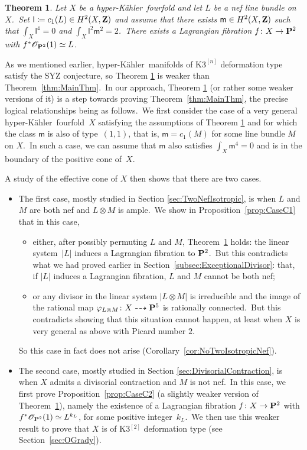 \documentclass[12pt]{amsart}
\def\cO{\mathscr{O}}
\def\Z{{\bf Z}}
\def\P{{\bf P}}
\def\phi{\varphi}
\def\ot{\otimes}
\def\isom{\simeq}
\def\dra{\dashrightarrow}
\def\hk{hyper-K\"ahler}
\newtheorem{theo}[lemm]{Theorem}
\theoremstyle{remark}
\def\lll{\ensuremath{\mathsf l}}
\def\mm{\ensuremath{\mathsf m}}
\begin{document}
\begin{theo}\label{thm:SYZ}
Let $X$ be a \hk\ fourfold and let $L$ be  a nef line bundle on $X$.\ Set
$\lll\coloneqq c_1(L) \in H^2(X,\Z)$ and assume that there exists $\mm\in H^2(X,\Z)$ such that     $\int_X \lll^4=0$ and $\int_X\lll^2\mm^2=2$.\
There exists a Lagrangian fibration $f\colon X\to\P^2$ with $f^*{\cO_{\P^2}}(1)\isom L$.
\end{theo}
As we mentioned earlier, \hk\ manifolds  of $\mathrm{K3}^{[n]}$ deformation type satisfy the SYZ conjecture, so Theorem \ref{thm:SYZ} is weaker than Theorem~\ref{thm:MainThm}.\  In our approach, Theorem \ref{thm:SYZ} (or rather  some weaker versions of it) is a step towards
proving   Theorem~\ref{thm:MainThm}, the precise logical relationships being   as follows.\
We first consider the case  of a very general \hk\ fourfold~$X$   satisfying the   assumptions  of Theorem \ref{thm:SYZ} and for which the class $\mm$ is also of type~$(1,1)$, that is, $\mm=c_1(M)$ for some line bundle $M$ on $X$.\
In such a case, we can assume that $\mm$ also satisfies $\int_X \mm^4=0$ and is in the boundary of the positive cone of~$X$.

A study of the effective cone of $X$ then shows that there are two cases.
\begin{itemize}
    \item The first case, mostly studied in Section \ref{sec:TwoNefIsotropic}, is when $L$ and $M$ are both nef and $L\ot M$ is ample.\
We show in  Proposition~\ref{prop:CaseC1} that in this case,
\begin{itemize}
    \item[$\circ$] either, after possibly permuting $L$ and $M$, Theorem~\ref{thm:SYZ} holds:   the linear system~$|L|$ induces a Lagrangian fibration to $\P^2$.\ But this contradicts what we had proved earlier in Section~\ref{subsec:ExceptionalDivisor}: that, if $|L|$ induces a Lagrangian fibration, $L$ and $M$ cannot be both nef;
    \item[$\circ$] or any divisor in the linear system $|L\otimes M|$ is irreducible and  the image of the rational map $\phi_{L\otimes M}\colon X\dra \P^5$ is rationally connected.\ But this contradicts   \cite[Theorem 4.2]{voisinfib}   showing that this situation cannot happen, at least when $X$ is very general as above  with Picard number $2$.
\end{itemize}
So this case in fact  does not arise (Corollary~\ref{cor:NoTwoIsotropicNef}).
    \item The second case, mostly studied in Section \ref{sec:DivisorialContraction}, is when $X$ admits a divisorial contraction and $M$ is not nef.\
    In this case, we  first prove Proposition~\ref{prop:CaseC2} (a slightly weaker version of Theorem~\ref{thm:SYZ}), namely the existence of a Lagrangian fibration $f\colon X\to\P^2$ with $f^*{\cO_{\P^2}}(1)\isom L^{k_L}$, for some positive integer~$k_L$.\
    We then use this weaker result to prove that $X$ is of  K3$^{[2]}$ deformation type (see Section~\ref{sec:OGrady}).
\end{itemize}
\end{document}
